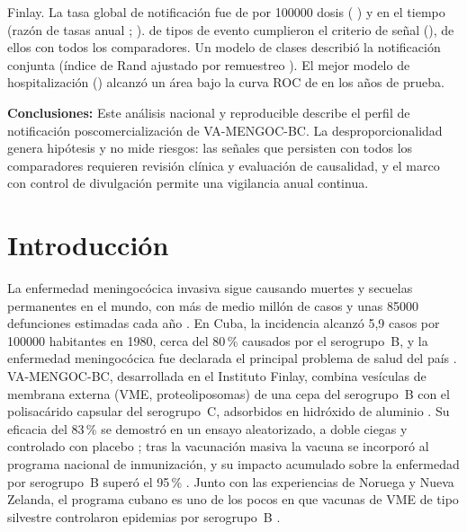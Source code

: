 \documentclass[11pt]{article}
\begin{document}
Finlay. La tasa global de notificación fue de \POPooledRate{} por \num{100000}
dosis (\CI{} \POPooledRateCI) y \POTrendWord{} en el tiempo (razón de tasas anual \POTrendRR;
\CI{} \POTrendRRCI). \POSignalsPrimaryFinlayVaccines{} de \PONEventsScreened{} tipos de evento
cumplieron el criterio de señal (\POSignalList), \PONSignalsRobust{} de ellos con todos los
comparadores. Un modelo de \POLCABestK{} clases describió la notificación conjunta (índice de Rand
ajustado por remuestreo \POLCAAri). El mejor modelo de hospitalización (\POBestModel) alcanzó un
área bajo la curva ROC de \POBestAuroc{} en los años de prueba.\par
\noindent\textbf{Conclusiones:} Este análisis nacional y reproducible describe el perfil de
notificación poscomercialización de VA-MENGOC-BC. La desproporcionalidad genera hipótesis y no mide
riesgos: las señales que persisten con todos los comparadores requieren revisión clínica y
evaluación de causalidad, y el marco con control de divulgación permite una vigilancia anual
continua.

\clearpage
\section{Introducción}\label{sec:intro}

La enfermedad meningocócica invasiva sigue causando muertes y secuelas permanentes en el mundo, con
más de medio millón de casos y unas \num{85000} defunciones estimadas cada año
\cite{SierraGonzalez2019}. En Cuba, la incidencia alcanzó 5,9 casos por \num{100000} habitantes en
1980, cerca del 80\,\% causados por el serogrupo~B, y la enfermedad meningocócica fue declarada el
principal problema de salud del país \cite{SierraGonzalez2019}. VA-MENGOC-BC, desarrollada en el
Instituto Finlay, combina vesículas de membrana externa (VME, proteoliposomas) de una cepa del
serogrupo~B con el polisacárido capsular del serogrupo~C, adsorbidos en hidróxido de aluminio
\cite{Sotolongo2007,Uli2006,Masforrol2017}. Su eficacia del 83\,\% se demostró en un ensayo
aleatorizado, a doble ciegas y controlado con placebo \cite{Sierra1991}; tras la vacunación masiva
la vacuna se incorporó al programa nacional de inmunización, y su impacto acumulado sobre la
enfermedad por serogrupo~B superó el 95\,\% \cite{Rodriguez1999,SierraGonzalez2019}. Junto con las
experiencias de Noruega y Nueva Zelanda, el programa cubano es uno de los pocos en que vacunas de VME
de tipo silvestre controlaron epidemias por serogrupo~B \cite{Holst2009,Holst2013}.
\end{document}
